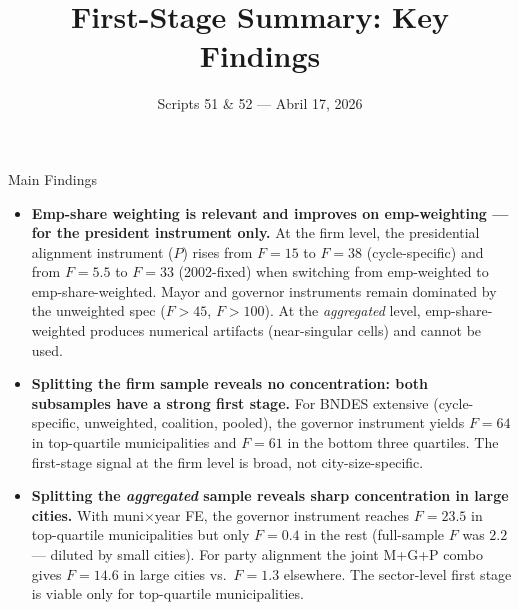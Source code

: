 \documentclass[aspectratio=169,10pt]{beamer}
\title{First-Stage Summary: Key Findings}
\subtitle{Scripts 51 \& 52 --- Abril 17, 2026}
\author{}
\date{}
\begin{document}
\begin{frame}
\titlepage
\end{frame}


\begin{frame}[t]{Main Findings}
\begin{itemize}\setlength{\itemsep}{0.75em}

  \item \textbf{Emp-share weighting is relevant and improves on emp-weighting
    --- for the president instrument only.}
    At the firm level, the presidential alignment instrument ($P$) rises from
    $F=15$ to $F=38$ (cycle-specific) and from $F=5.5$ to $F=33$ (2002-fixed)
    when switching from emp-weighted to emp-share-weighted.  Mayor and governor
    instruments remain dominated by the unweighted spec ($F>45$, $F>100$).
    At the \emph{aggregated} level, emp-share-weighted produces numerical
    artifacts (near-singular cells) and cannot be used.

  \item \textbf{Splitting the firm sample reveals no concentration: both
    subsamples have a strong first stage.}
    For BNDES extensive (cycle-specific, unweighted, coalition, pooled),
    the governor instrument yields $F=64$ in top-quartile municipalities and
    $F=61$ in the bottom three quartiles.  The first-stage signal at the firm
    level is broad, not city-size-specific.

  \item \textbf{Splitting the \emph{aggregated} sample reveals sharp
    concentration in large cities.}
    With muni$\times$year FE, the governor instrument reaches $F=23.5$ in
    top-quartile municipalities but only $F=0.4$ in the rest
    (full-sample $F$ was $2.2$ --- diluted by small cities).
    For party alignment the joint M+G+P combo gives $F=14.6$ in large cities
    vs.\ $F=1.3$ elsewhere.  The sector-level first stage is viable only for
    top-quartile municipalities.

\end{itemize}
\end{frame}

\end{document}
